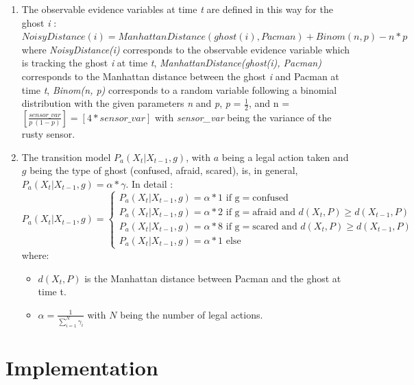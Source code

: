 \documentclass{article}
\newcommand\round[1]{\left[#1\right]}
\begin{document}
\begin{enumerate}[label=\alph*.,leftmargin=*]
    \item The observable evidence variables at time \textit{t} are defined in
    this way for the ghost \textit{i} : \\
    
    $NoisyDistance(i) = 
    ManhattanDistance(ghost(i), Pacman) + Binom(n, p) - n * p$ \\

    where \textit{NoisyDistance(i)} corresponds to the observable evidence variable 
    which is tracking the ghost \textit{i} at time \textit{t}, \textit{ManhattanDistance(ghost(i), Pacman)}
    corresponds to the Manhattan distance between the ghost \textit{i} and Pacman at time \textit{t},
    \textit{Binom(n, p)} corresponds to a random variable following a binomial distribution with the given parameters
    \textit{n} and \textit{p}, \textit{p} = $\frac{1}{2}$, and n = $\round{\frac{sensor\_var}{p \ (1 - p)}} = \round{4 * sensor\_var}$ with \textit{sensor\_var} being the variance of the rusty sensor.
    
    \item The transition model $P_a(X_t | X_{t-1}, g)$, with $a$ being a legal action taken and $g$ being the type of ghost (confused, afraid, scared), is, in general, $P_a(X_t | X_{t-1}, g) = \alpha * \gamma$. In detail :
    \[
  P_a(X_t | X_{t-1}, g)=\begin{cases}
               P_a(X_t | X_{t-1}, g) = \alpha * 1 \text{ if g} = \text{confused} \\
               P_a(X_t | X_{t-1}, g) = \alpha * 2 \text{ if g} = \text{afraid and }d(X_t, P) \geq d(X_{t-1},P) \\
               P_a(X_t | X_{t-1}, g) = \alpha * 8 \text{ if g} = \text{scared and }d(X_t, P) \geq d(X_{t-1},P) \\
               P_a(X_t | X_{t-1}, g) = \alpha * 1 \text{ else}
            \end{cases}
\]
where:
\begin{itemize}
	\item $d(X_t, P)$ is the Manhattan distance between Pacman and the ghost at time t.
	\item $\alpha = \frac{1}{\sum_{i=1}^N {\gamma_i}}$ with $N$ being the number of legal actions.
\end{itemize}

\end{enumerate}

\section{Implementation}
\end{document}
